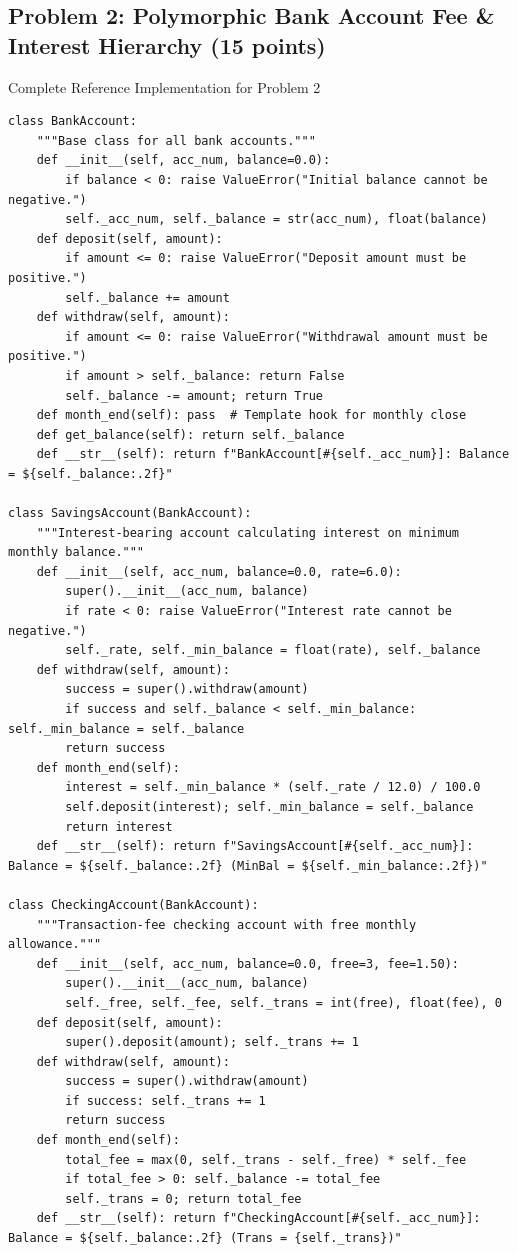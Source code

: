 \documentclass[11pt,a4paper]{article}
\begin{document}
\newpage
\subsection*{Problem 2: Polymorphic Bank Account Fee \& Interest Hierarchy (15 points)}

\begin{solbox}{Complete Reference Implementation for Problem 2}
\begin{lstlisting}
class BankAccount:
    """Base class for all bank accounts."""
    def __init__(self, acc_num, balance=0.0):
        if balance < 0: raise ValueError("Initial balance cannot be negative.")
        self._acc_num, self._balance = str(acc_num), float(balance)
    def deposit(self, amount):
        if amount <= 0: raise ValueError("Deposit amount must be positive.")
        self._balance += amount
    def withdraw(self, amount):
        if amount <= 0: raise ValueError("Withdrawal amount must be positive.")
        if amount > self._balance: return False
        self._balance -= amount; return True
    def month_end(self): pass  # Template hook for monthly close
    def get_balance(self): return self._balance
    def __str__(self): return f"BankAccount[#{self._acc_num}]: Balance = ${self._balance:.2f}"

class SavingsAccount(BankAccount):
    """Interest-bearing account calculating interest on minimum monthly balance."""
    def __init__(self, acc_num, balance=0.0, rate=6.0):
        super().__init__(acc_num, balance)
        if rate < 0: raise ValueError("Interest rate cannot be negative.")
        self._rate, self._min_balance = float(rate), self._balance
    def withdraw(self, amount):
        success = super().withdraw(amount)
        if success and self._balance < self._min_balance: self._min_balance = self._balance
        return success
    def month_end(self):
        interest = self._min_balance * (self._rate / 12.0) / 100.0
        self.deposit(interest); self._min_balance = self._balance
        return interest
    def __str__(self): return f"SavingsAccount[#{self._acc_num}]: Balance = ${self._balance:.2f} (MinBal = ${self._min_balance:.2f})"

class CheckingAccount(BankAccount):
    """Transaction-fee checking account with free monthly allowance."""
    def __init__(self, acc_num, balance=0.0, free=3, fee=1.50):
        super().__init__(acc_num, balance)
        self._free, self._fee, self._trans = int(free), float(fee), 0
    def deposit(self, amount):
        super().deposit(amount); self._trans += 1
    def withdraw(self, amount):
        success = super().withdraw(amount)
        if success: self._trans += 1
        return success
    def month_end(self):
        total_fee = max(0, self._trans - self._free) * self._fee
        if total_fee > 0: self._balance -= total_fee
        self._trans = 0; return total_fee
    def __str__(self): return f"CheckingAccount[#{self._acc_num}]: Balance = ${self._balance:.2f} (Trans = {self._trans})"


\end{lstlisting}
\end{solbox}
\end{document}
